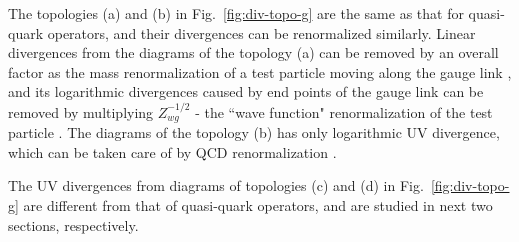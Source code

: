 The topologies (a) and (b) in Fig.~\ref{fig:div-topo-g} are the same as that for quasi-quark operators, and their divergences can be renormalized similarly.  Linear divergences from the diagrams of the topology (a) can be removed by an overall factor as the mass renormalization of a test particle moving along the gauge link \cite{Polyakov:1980ca}, and its logarithmic divergences caused by end points of the gauge link can be removed by multiplying $Z_{wg}^{-1/2}$ - the ``wave function" renormalization of the test particle \cite{Dotsenko:1979wb}. The diagrams of the topology (b) has only logarithmic UV divergence, which can be taken care of by QCD  renormalization \cite{Dotsenko:1979wb}.

The UV divergences from diagrams of topologies (c) and (d) in Fig.~\ref{fig:div-topo-g} are different from that of quasi-quark operators, and are studied in next two sections, respectively.
